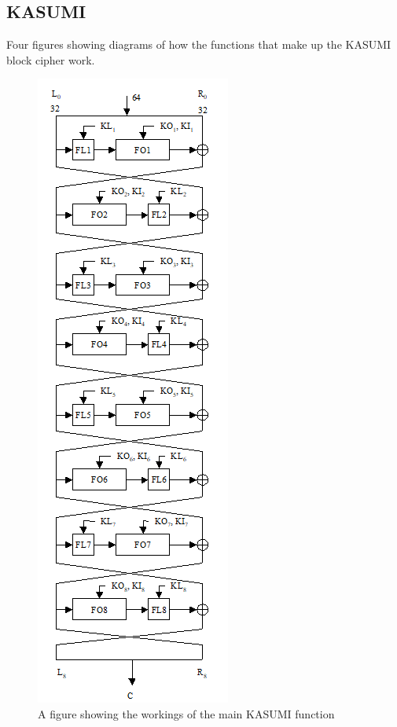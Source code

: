 \documentclass[10pt,journal,compsoc]{IEEEtran}
\begin{document}
\newpage
\begin{appendices}
\section{KASUMI}\label{appendix:KASUMI}
Four figures showing diagrams of how the functions that make up the KASUMI block cipher work.

\begin{figure}[H]
    \centering
    \includegraphics[width=\linewidth, height=0.85\textheight, keepaspectratio]{Figures/kasumi_diag.png}
    \caption{A figure showing the workings of the main KASUMI function}
    \label{fig:kasumi-main}
\end{figure}


\end{appendices}
\end{document}
